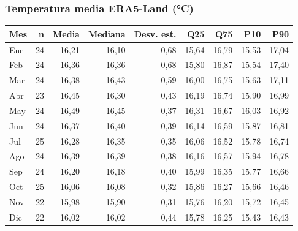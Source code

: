 \documentclass[10pt,a4paper]{article}
\begin{document}
\subsubsection*{Temperatura media ERA5-Land (°C)}
\begin{center}\small\begin{tabular}{lrrrrrrrr}\hline
Mes & n & Media & Mediana & Desv. est. & Q25 & Q75 & P10 & P90 \\\hline
Ene & 24 & 16,21 & 16,10 & 0,68 & 15,64 & 16,79 & 15,53 & 17,04\\
Feb & 24 & 16,36 & 16,36 & 0,68 & 15,80 & 16,87 & 15,54 & 17,40\\
Mar & 24 & 16,38 & 16,43 & 0,59 & 16,00 & 16,75 & 15,63 & 17,11\\
Abr & 23 & 16,45 & 16,30 & 0,43 & 16,19 & 16,74 & 15,90 & 16,99\\
May & 24 & 16,49 & 16,45 & 0,37 & 16,31 & 16,67 & 16,03 & 16,92\\
Jun & 24 & 16,37 & 16,40 & 0,39 & 16,14 & 16,59 & 15,87 & 16,81\\
Jul & 25 & 16,28 & 16,35 & 0,35 & 16,06 & 16,52 & 15,78 & 16,74\\
Ago & 24 & 16,39 & 16,39 & 0,38 & 16,16 & 16,57 & 15,94 & 16,78\\
Sep & 24 & 16,20 & 16,18 & 0,40 & 15,99 & 16,35 & 15,77 & 16,66\\
Oct & 25 & 16,06 & 16,08 & 0,32 & 15,86 & 16,27 & 15,66 & 16,46\\
Nov & 22 & 15,98 & 15,90 & 0,31 & 15,76 & 16,20 & 15,72 & 16,45\\
Dic & 22 & 16,02 & 16,02 & 0,44 & 15,78 & 16,25 & 15,43 & 16,43\\
\hline\end{tabular}\end{center}
\end{document}
